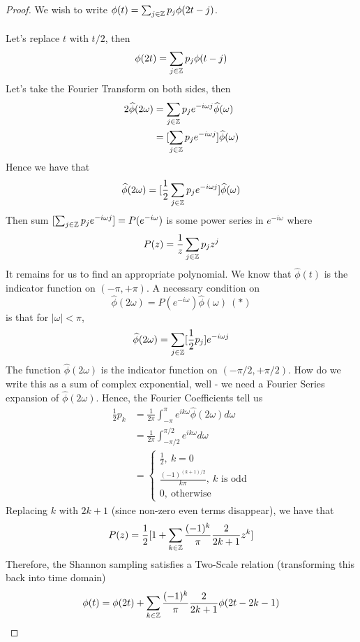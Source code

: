 \documentclass{article}
\begin{document}
\begin{proof}
    We wish to write $\phi(t) = \sum_{j \in \mathbb{Z}} p_j \phi(2t - j)$.\\\\
    Let's replace $t$ with $t/2$, then
    \[\phi(2t) = \sum_{j \in \mathbb{Z}} p_j \phi(t - j)\]
    Let's take the Fourier Transform on both sides, then
    \begin{align*}
        2\widehat{\phi}(2\omega) &= \sum_{j \in \mathbb{Z}} p_j e^{-i\omega j} \widehat{\phi}(\omega)\\
        &= [\sum_{j \in \mathbb{Z}} p_j e^{-i\omega j}] \widehat{\phi}(\omega)
    \end{align*}
    Hence we have that
    \[\widehat{\phi}(2\omega) = [\frac{1}{2} \sum_{j \in \mathbb{Z}} p_j e^{-i\omega j}] \widehat{\phi}(\omega)\]
    Then sum $[\sum_{j \in \mathbb{Z}} p_j e^{-i\omega j}] = P(e^{-i\omega})$ is some power series in $e^{-i\omega}$ where
    \[P(z) = \frac{1}{z} \sum_{j \in \mathbb{Z}} p_j z^j\]
    It remains for us to find an appropriate polynomial. We know that $\widehat{\phi}(t)$ is the indicator function on $(-\pi, +\pi)$. A necessary condition on
        \[\widehat{\phi}(2 \omega) = P(e^{-i\omega}) \widehat{\phi}(\omega)\ (*)\]
        is that for $|\omega| < \pi$,
        \[\widehat{\phi}(2\omega) = \sum_{j \in \mathbb{Z}} [\frac{1}{2} p_j] e^{-i\omega j} \]
        The function $\widehat{\phi}(2\omega)$ is the indicator function on $(-\pi/2, +\pi/2)$. How do we write this as a sum of complex exponential, well - we need a Fourier Series expansion of $\widehat{\phi}(2\omega)$. Hence, the Fourier Coefficients tell us
        \begin{align*}
            \frac{1}{2} p_k &= \frac{1}{2\pi} \int_{-\pi}^\pi e^{ik\omega} \widehat{\phi}(2\omega) d\omega\\
            &= \frac{1}{2\pi} \int_{-\pi/2}^{\pi/2} e^{ik \omega} d\omega\\
            &= \begin{cases}
            \frac{1}{2},\ k = 0\\
                \frac{(-1)^{(k+1)/2}}{k\pi},\ \text{$k$ is odd}\\
                0,\ \text{otherwise}
            \end{cases}
        \end{align*}
        Replacing $k$ with $2k + 1$ (since non-zero even terms disappear), we have that
        \[P(z) = \frac{1}{2} [1 + \sum_{k \in \mathbb{Z}} \frac{(-1)^k}{\pi} \frac{2}{2k+1} z^k]\]
        Therefore, the Shannon sampling satisfies a Two-Scale relation (transforming this back into time domain)
        \[\phi(t) = \phi(2t) + \sum_{k \in \mathbb{Z}} \frac{(-1)^k}{\pi} \frac{2}{2k+1} \phi(2t - 2k - 1)\]
\end{proof}
\end{document}
